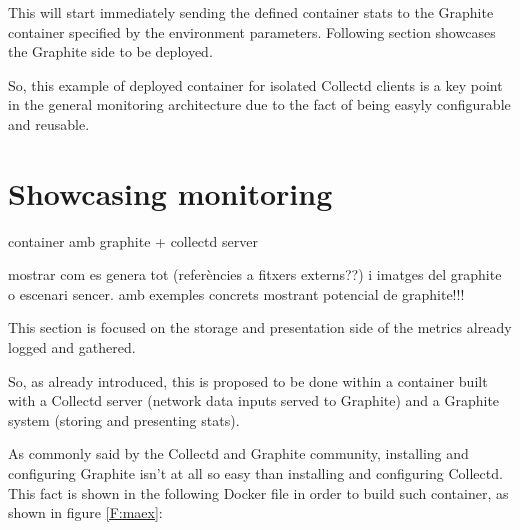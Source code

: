 This will start immediately sending the defined container stats to the Graphite container specified by the environment parameters. Following section showcases the Graphite side to be deployed.

So, this example of deployed container for isolated Collectd clients is a key point in the general monitoring architecture due to the fact of being easyly configurable and reusable.

\section{Showcasing monitoring}

container amb graphite + collectd server

mostrar com es genera tot (referències a fitxers externs??) i imatges del graphite o escenari sencer. amb exemples concrets mostrant potencial de graphite!!!

This section is focused on the storage and presentation side of the metrics already logged and gathered.

So, as already introduced, this is proposed to be done within a container built with a Collectd server (network data inputs served to Graphite) and a Graphite system (storing and presenting stats).

As commonly said by the Collectd and Graphite community, installing and configuring Graphite isn't at all so easy than installing and configuring Collectd. This fact is shown in the following Docker file in order to build such container, as shown in figure \ref{F:maex}:

